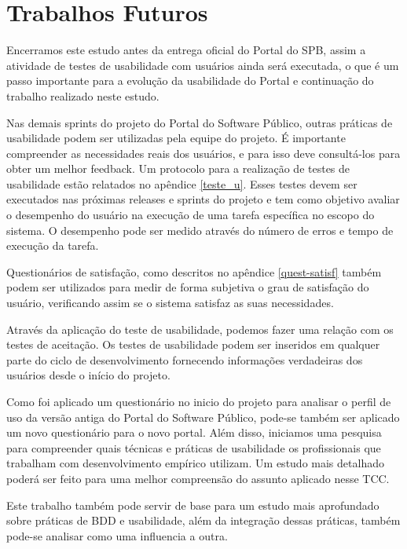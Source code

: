 \section{Trabalhos Futuros}

Encerramos este estudo antes da entrega oficial do Portal do SPB, assim a atividade de testes de usabilidade com usuários ainda será executada, o que é um passo importante para a evolução da usabilidade do Portal e continuação do trabalho realizado neste estudo.


Nas demais sprints do projeto do Portal do Software Público, outras práticas de usabilidade podem ser utilizadas pela equipe do projeto. É importante compreender as necessidades reais dos usuários, e para isso deve consultá-los para obter um melhor feedback. Um protocolo para a realização de testes de usabilidade estão relatados no apêndice \ref{teste_u}.
%
Esses testes devem ser executados nas próximas releases e sprints do projeto e tem como objetivo avaliar o desempenho do usuário na execução de uma tarefa específica no escopo do sistema. O desempenho pode ser medido através do número de erros e tempo de execução da tarefa. 

Questionários de satisfação, como descritos no apêndice \ref{quest-satisf} também podem ser utilizados para medir de forma subjetiva o grau de satisfação do usuário, verificando assim se o sistema satisfaz as suas necessidades.

Através da aplicação do teste de usabilidade, podemos fazer uma relação com os testes de aceitação. Os testes de usabilidade podem ser inseridos em qualquer parte do ciclo de desenvolvimento fornecendo informações verdadeiras dos usuários desde o início do projeto.

Como foi aplicado um questionário no inicio do projeto para analisar o perfil de uso da versão antiga do Portal do Software Público, pode-se também ser aplicado um novo questionário para o novo portal.
%
Além disso, iniciamos uma pesquisa para compreender quais técnicas e práticas de usabilidade os profissionais que trabalham com desenvolvimento empírico utilizam. Um estudo mais detalhado poderá ser feito para uma melhor compreensão do assunto aplicado nesse TCC. 

Este trabalho também pode servir de base para um estudo mais aprofundado sobre práticas de BDD e usabilidade, além da integração dessas práticas, também pode-se analisar como uma influencia a outra.
